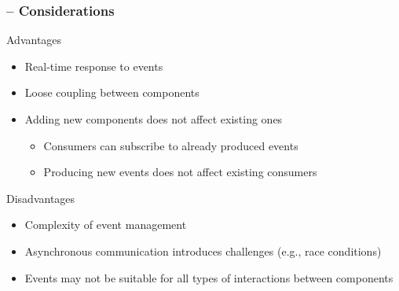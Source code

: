 \begin{frame}
    \frametitle{\insertsubsection{} -- Considerations}
    \begin{fancycolumns}[widths={45,55}]
        \begin{motivation}{Advantages}
            \begin{itemize}
                \item Real-time response to events
                \item Loose coupling between components
                \item Adding new components does not affect existing ones
                      \begin{itemize}
                          \item Consumers can subscribe to already produced events
                          \item Producing new events does not affect existing consumers
                      \end{itemize}
            \end{itemize}
        \end{motivation}
        \begin{note}{Disadvantages}
            \begin{itemize}
                \item Complexity of event management
                \item Asynchronous communication introduces challenges (e.g., race conditions)
                \item Events may not be suitable for all types of interactions between components
            \end{itemize}
        \end{note}
        \nextcolumn
        \eventdrivendefault{}
    \end{fancycolumns}
\end{frame}


